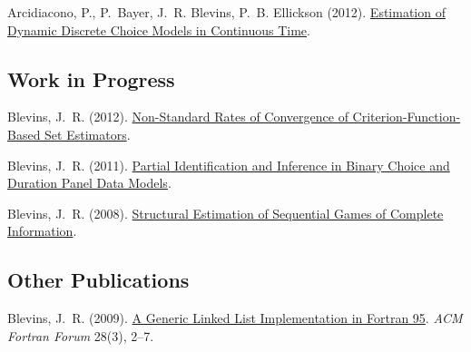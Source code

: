 \documentclass[10pt,letterpaper]{article}
\renewenvironment{itemize}{
  \begin{list}{}{
    \setlength{\leftmargin}{1.5em}
    \setlength{\itemsep}{0.25em}
    \setlength{\parskip}{0pt}
    \setlength{\parsep}{0.25em}
  }
}{
  \end{list}
}
\begin{document}
\begin{itemize}
\item Arcidiacono, P., P.~Bayer, J.~R. Blevins, P.~B. Ellickson (2012).
  \href{http://jblevins.org/research/abbe}{Estimation of Dynamic Discrete Choice Models in Continuous Time}.
\end{itemize}

\subsection*{Work in Progress}

\begin{itemize}
\item Blevins, J.~R. (2012).
  \href{http://jblevins.org/research/cuberoot}{Non-Standard Rates of Convergence of Criterion-Function-Based Set Estimators}.
\item Blevins, J.~R. (2011).
  \href{http://jblevins.org/research/panel}{Partial Identification and Inference in Binary Choice and Duration Panel Data Models}.
\item Blevins, J.~R. (2008).
  \href{http://jblevins.org/research/seqgame}{Structural Estimation of Sequential Games of Complete Information}.
\end{itemize}

%

\subsection*{Other Publications}

\begin{itemize}

\item Blevins, J.~R. (2009).
  \href{http://jblevins.org/research/generic-list}{A Generic Linked List Implementation in Fortran 95}.
  \textit{ACM Fortran Forum} 28(3), 2--7.

\end{itemize}
\end{document}
